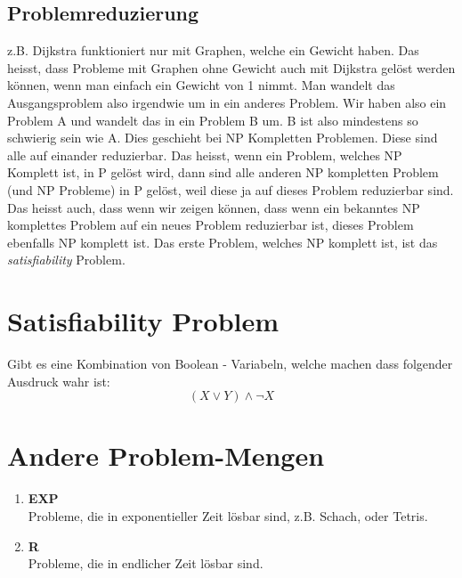\subsection{Problemreduzierung}
z.B. Dijkstra funktioniert nur mit Graphen, welche ein Gewicht haben. Das heisst, dass Probleme mit Graphen ohne Gewicht auch mit Dijkstra gelöst werden können, wenn  man einfach ein Gewicht von 1 nimmt. Man wandelt das Ausgangsproblem also irgendwie um in ein anderes Problem. Wir haben also ein Problem A und wandelt das in ein Problem B um. B ist also mindestens so schwierig sein wie A. Dies geschieht bei NP Kompletten Problemen. Diese sind alle auf einander reduzierbar. Das heisst, wenn ein Problem, welches NP Komplett ist, in P gelöst wird, dann sind alle anderen NP kompletten Problem (und NP Probleme) in P gelöst, weil diese ja auf dieses Problem reduzierbar sind. Das heisst auch, dass wenn wir zeigen können, dass wenn ein bekanntes NP komplettes Problem auf ein neues Problem reduzierbar ist, dieses Problem ebenfalls NP komplett ist. Das erste Problem, welches NP komplett ist, ist das \textit{satisfiability} Problem.

\section{Satisfiability Problem}
Gibt es eine Kombination von Boolean - Variabeln, welche machen dass folgender Ausdruck wahr ist:
\begin{displaymath}
(X \lor Y) \land\neg X
\end{displaymath}

\section{Andere Problem-Mengen}
\begin{enumerate}
	\item \textbf{EXP} \\
	Probleme, die in exponentieller Zeit lösbar sind, z.B. Schach, oder Tetris.
	\item \textbf{R} \\
	Probleme, die in endlicher Zeit lösbar sind.
\end{enumerate}

